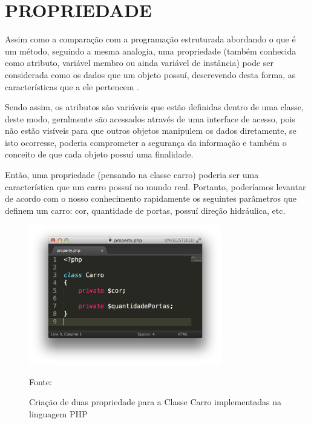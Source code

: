\section{PROPRIEDADE}
Assim como a comparação com a programação estruturada abordando o que é um 
método, seguindo a mesma analogia, uma propriedade (também conhecida como 
atributo, variável membro ou ainda variável de instância) pode ser considerada 
como os dados que um objeto possuí, descrevendo desta forma, as características 
que a ele pertencem \cite{programmingPhp}.

Sendo assim, os atributos são variáveis que estão definidas dentro de uma
classe, deste modo, geralmente são acessados através de uma interface de acesso,
pois não estão visíveis para que outros objetos manipulem os dados diretamente, 
se isto ocorresse, poderia comprometer a segurança da informação e também o 
conceito de que cada objeto possuí uma finalidade.

Então, uma propriedade (pensando na classe carro) poderia ser uma característica
que um carro possuí no mundo real. Portanto, poderíamos levantar de acordo com 
o nosso conhecimento rapidamente os seguintes parâmetros que definem um carro: 
cor, quantidade de portas, possuí direção hidráulica, etc.

\begin{figure}[h!tb]
	\caption{Criação de duas propriedade para a Classe Carro implementadas na
	linguagem PHP}
	\label{fig:propriedade}
	
	\centering
	\includegraphics[width=0.75\textwidth]{images/property.png}
	
	\centering
	\footnotesize Fonte: \fonteOAutor
\end{figure}

\FloatBarrier 	%

